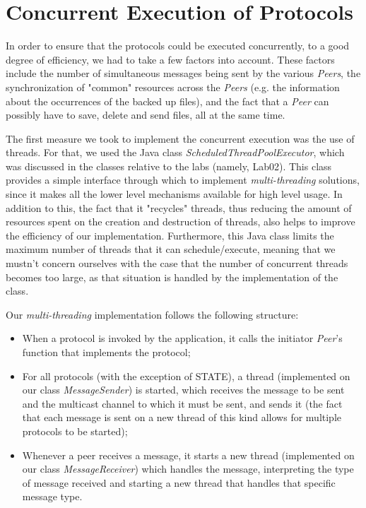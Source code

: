 \documentclass[a4paper]{article}
\begin{document}
\section{Concurrent Execution of Protocols}
In order to ensure that the protocols could be executed concurrently, to a good degree of 
efficiency, we had to take a few factors into account. These factors include the number of
simultaneous messages being sent by the various \textit{Peers}, the synchronization of "common" 
resources across the \textit{Peers} (e.g. the information about the occurrences of the backed up
files), and the fact that a \textit{Peer} can possibly have to save, delete and send files, all 
at the same time.

\bigskip

The first measure we took to implement the concurrent execution was the use of threads. For that,
we used the Java class \textit{ScheduledThreadPoolExecutor}, which was discussed in the classes 
relative to the labs (namely, Lab02). This class provides a simple interface through which to 
implement \textit{multi-threading} solutions, since it makes all the lower level mechanisms 
available for high level usage. In addition to this, the fact that it "recycles" threads, thus 
reducing the amount of resources spent on the creation and destruction of threads, also helps to 
improve the efficiency of our implementation. Furthermore, this Java class limits the maximum 
number of threads that it can schedule/execute, meaning that we mustn't concern ourselves with 
the case that the number of concurrent threads becomes too large, as that situation is handled by
the implementation of the class.

\bigskip

Our \textit{multi-threading} implementation follows the following structure:
\begin{itemize}
    \item When a protocol is invoked by the application, it calls the initiator \textit{Peer}'s 
    function that implements the protocol;
    \item For all protocols (with the exception of STATE), a thread (implemented on our class 
    \textit{MessageSender}) is started, which receives the message to be sent and the multicast 
    channel to which it must be sent, and sends it (the fact that each message is sent on a new
    thread of this kind allows for multiple protocols to be started);
    \item Whenever a peer receives a message, it starts a new thread (implemented on our class 
    \textit{MessageReceiver}) which handles the message, interpreting the type of message 
    received and starting a new thread that handles that specific message type.
\end{itemize}
\end{document}
